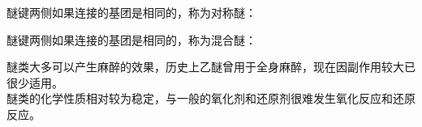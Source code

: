 \documentclass[UTF8]{ctexart}
\begin{document}
    醚键两侧如果连接的基团是相同的，称为对称醚：\vspace{5pt}
    \begin{center}
        \qquad\quad
    \end{center}\vspace{20pt}
    醚键两侧如果连接的基团是相同的，称为混合醚：\vspace{5pt}
    \begin{center}
    \end{center}\vspace{20pt}
    醚类大多可以产生麻醉的效果，历史上乙醚曾用于全身麻醉，现在因副作用较大已很少适用。\\[3mm]
    醚类的化学性质相对较为稳定，与一般的氧化剂和还原剂很难发生氧化反应和还原反应。

\newpage
\end{document}
